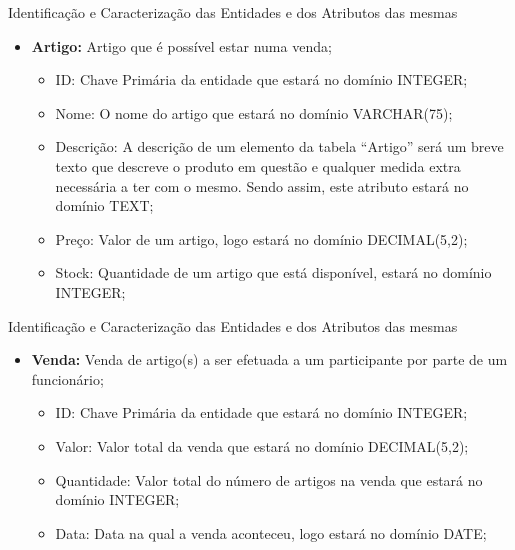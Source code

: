 \documentclass[compress,svgnames,handout,13.7pt]{beamer}
\begin{document}
\begin{frame}{Identificação e Caracterização das Entidades e dos Atributos das mesmas}
\begin{itemize}
                 \item{\textbf{Artigo:}} Artigo que é possível estar numa venda;
                     \begin{itemize}
                     \item{ID:} Chave Primária da entidade que estará no domínio INTEGER;
                       
                     \item{Nome:} O nome do artigo que estará no domínio VARCHAR(75);
                       
                     \item{Descrição:} A descrição de um elemento da tabela ``Artigo'' será
                       um breve texto que descreve o produto em questão e qualquer medida extra necessária a ter com o mesmo. Sendo assim, este atributo estará no domínio TEXT;
                       
                     \item{Preço:} Valor de um artigo, logo estará no domínio DECIMAL(5,2);
                       
                     \item{Stock:} Quantidade de um artigo que está disponível, estará no domínio INTEGER;
                       
                     \end{itemize}
\end{itemize}
\end{frame}
\begin{frame}{Identificação e Caracterização das Entidades e dos Atributos das mesmas}
\begin{itemize}
                 \item{\textbf{Venda:}} Venda de artigo(s) a ser efetuada a um participante por parte de um funcionário;
                     \begin{itemize}
                     \item{ID:} Chave Primária da entidade que estará no domínio INTEGER;
                       
                     \item{Valor:} Valor total da venda que estará no domínio DECIMAL(5,2);
                       
                     \item{Quantidade:} Valor total do número de artigos na venda que estará no domínio INTEGER;
                       
                     \item{Data:} Data na qual a venda aconteceu, logo estará no domínio DATE;
                       
                     \end{itemize}
\end{itemize}
\end{frame}
\end{document}
